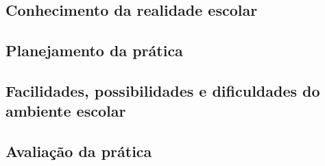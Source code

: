 \hspace{1.5cm}
\subsection*{Conhecimento da realidade escolar}

\subsection*{Planejamento da prática}

\subsection*{Facilidades, possibilidades e dificuldades do ambiente escolar}

\subsection*{Avaliação da prática}